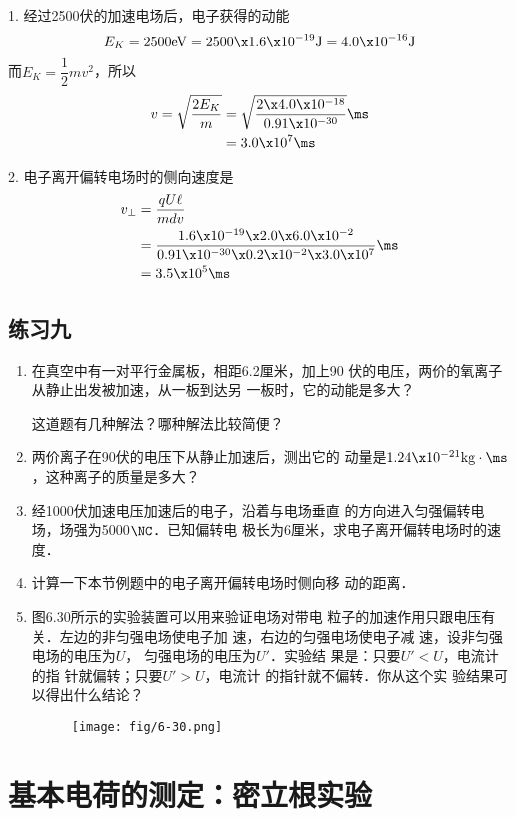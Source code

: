 \begin{solution}
1. 经过2500伏的加速电场后，电子获得的动能
\[E_K=2500{\rm eV}=2500\x1.6\x10^{-19}{\rm J}=4.0\x10^{-16}{\rm J} \]
而$E_K=\dfrac{1}{2}mv^2$，所以
\[\begin{split}
	v=\sqrt{\frac{2E_K}{m}}&=\sqrt{\frac{2\x 4.0\x 10^{-18}}{0.91\x 10^{-30}}}\ms\\
	&=3.0\x 10^7\ms
\end{split} \]	

2. 电子离开偏转电场时的侧向速度是
\[\begin{split}
	v_{\bot}&=\frac{qU\ell}{mdv}\\
	&=\frac{1.6\x10^{-19}\x2.0\x6.0\x10^{-2}}{0.91\x10^{-30}\x0.2\x10^{-2}\x3.0\x10^{7}} \ms\\
	&=3.5\x 10^5\ms
\end{split} \]	
\end{solution}

\subsection*{练习九}
\begin{enumerate}
	\item 在真空中有一对平行金属板，相距6.2厘米，加上90
伏的电压，两价的氧离子从静止出发被加速，从一板到达另
一板时，它的动能是多大？

这道题有几种解法？哪种解法比较简便？

\item 两价离子在90伏的电压下从静止加速后，测出它的
动量是$1.24\x10^{-21}{\rm kg}\cdot \ms$，这种离子的质量是多大？

\item 经1000伏加速电压加速后的电子，沿着与电场垂直
的方向进入匀强偏转电场，场强为5000$\NC$．已知偏转电
极长为6厘米，求电子离开偏转电场时的速度．
\item 计算一下本节例题中的电子离开偏转电场时侧向移
动的距离．
\item 图6.30所示的实验装置可以用来验证电场对带电
粒子的加速作用只跟电压有关．左边的非匀强电场使电子加
速，右边的匀强电场使电子减
速，设非匀强电场的电压为$U$，
匀强电场的电压为$U'$．实验结
果是：只要$U'<U$，电流计的指
针就偏转；只要$U'>U$，电流计
的指针就不偏转．你从这个实
验结果可以得出什么结论？
\begin{figure}[htp]\centering
	\texttt{[image: fig/6-30.png]}
	\caption{}
	\end{figure}
\end{enumerate}

\section{基本电荷的测定：密立根实验}

